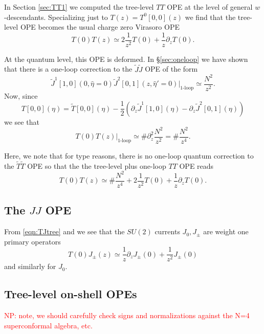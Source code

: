 \documentclass[11pt]{amsart}
\newcommand{\del}{\partial}
\newcommand{\what}{\widehat}
\newcommand{\til}{\widetilde}
\theoremstyle{thm}
\numberwithin{equation}{subsection}
\theoremstyle{def}
\theoremstyle{rem}
\begin{document}
In Section \ref{sec:TT1} we computed the tree-level $TT$ OPE at the level of general $w$-descendants.
Specializing just to $T (z) = T^0[0,0](z)$ we find that the tree-level OPE becomes the usual charge zero Virasoro OPE
\[
T(0) T(z) \simeq 2 \frac{1}{z^2} T(0) + \frac{1}{z} \partial_z T(0) .
\]

At the quantum level, this OPE is deformed. 
In \S \ref{sec:oneloop} we have shown that there is a one-loop correction to the $\til J \til J$ OPE of the form 
\[
\til J^{1}[1,0] (0, \what\eta = 0) \til J^{2} [0,1] (z, \what\eta'=0) |_{\text{1-loop}} \simeq \frac{N^2}{z^2} .
\]
Now, since 
\[
T[0,0] (\eta) = \til T[0,0] (\eta) - \frac12 \left(\del_z \til J^{1}[1,0] (\eta) - \del_z \til J^{2}[0,1] (\eta) \right) 
\]
we see that 
\[
T(0) T(z)|_{\text{1-loop}} \simeq \# \del_z^2 \frac{N^2}{z^2} = \# \frac{N^2}{z^4} .
\]

Here, we note that for type reasons, there is no one-loop quantum correction to the $\til T \til T$ OPE so that the the tree-level plus one-loop $TT$ OPE reads
\[
T(0) T(z) \simeq \# \frac{N^2}{z^4} + 2 \frac{1}{z^2} T(0) + \frac{1}{z} \partial_z T(0) .
\]


\subsection{The $JJ$ OPE } 

From \eqref{eqn:TJtree} and we see that the $SU(2)$ currents $J_0, J_\pm$ are weight one primary operators
\[
T(0) J_\pm (z) \simeq \frac1z \partial_z J_\pm (0) + \frac{1}{z^2} J_\pm (0) 
\]
and similarly for $J_0$. 

\subsection{Tree-level on-shell OPEs}
\textcolor{red}{NP: note, we should carefully check signs and normalizations against the N=4 superconformal algebra, etc.}
\end{document}
